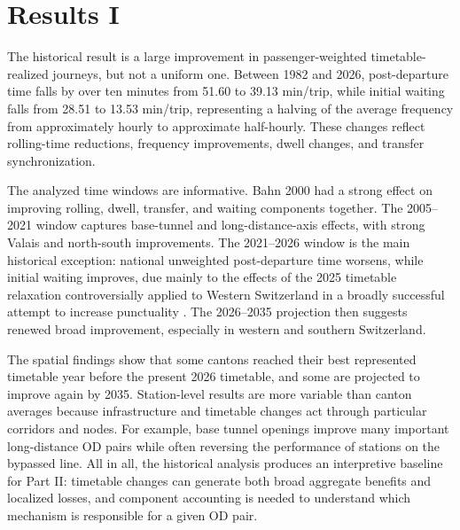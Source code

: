 \documentclass[conference]{IEEEtran}
\begin{document}
\section{Results I}
The historical result is a large improvement in passenger-weighted timetable-realized journeys, but not a uniform one. Between 1982 and 2026, post-departure time falls by over ten minutes from 51.60 to 39.13 min/trip, while initial waiting falls from 28.51 to 13.53 min/trip, representing a halving of the average frequency from approximately hourly to approximate half-hourly. These changes reflect rolling-time reductions, frequency improvements, dwell changes, and transfer synchronization.

The analyzed time windows are informative. Bahn 2000 had a strong effect on improving rolling, dwell, transfer, and waiting components together. The 2005--2021 window captures base-tunnel and long-distance-axis effects, with strong Valais and north-south improvements. The 2021--2026 window is the main historical exception: national unweighted post-departure time worsens, while initial waiting improves, due mainly to the effects of the 2025 timetable relaxation controversially applied to Western Switzerland in a broadly successful attempt to increase punctuality \cite{sbbRomandie2025Punctuality}. The 2026--2035 projection then suggests renewed broad improvement, especially in western and southern Switzerland.

The spatial findings show that some cantons reached their best represented timetable year before the present 2026 timetable, and some are projected to improve again by 2035. Station-level results are more variable than canton averages because infrastructure and timetable changes act through particular corridors and nodes. For example, base tunnel openings improve many important long-distance OD pairs while often reversing the performance of stations on the bypassed line. All in all, the historical analysis produces an interpretive baseline for Part II: timetable changes can generate both broad aggregate benefits and localized losses, and component accounting is needed to understand which mechanism is responsible for a given OD pair.
\end{document}
